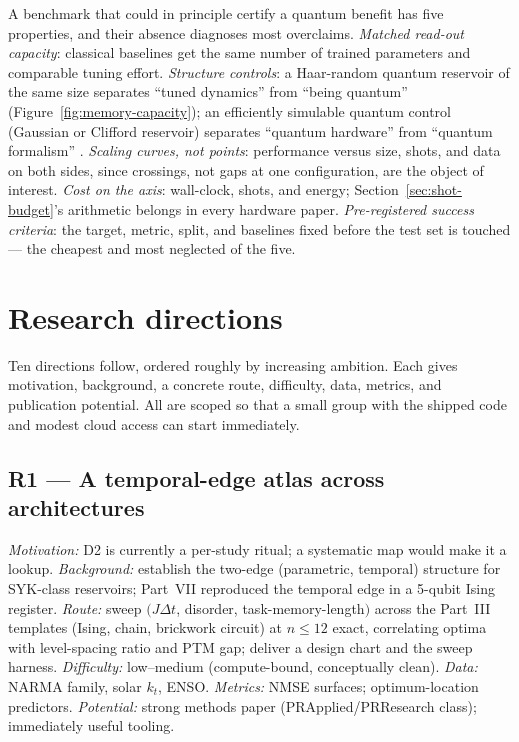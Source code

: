 A benchmark that could in principle certify a quantum benefit has five
properties, and their absence diagnoses most overclaims. \emph{Matched
read-out capacity}: classical baselines get the same number of trained
parameters and comparable tuning effort. \emph{Structure controls}: a
Haar-random quantum reservoir of the same size separates ``tuned dynamics''
from ``being quantum'' (Figure~\ref{fig:memory-capacity}); an efficiently
simulable quantum control (Gaussian or Clifford reservoir) separates
``quantum hardware'' from ``quantum formalism''
\citep{nokkala2021gaussian,gotting2023exploring,palacios2024role}.
\emph{Scaling curves, not points}: performance versus size, shots, and data
on both sides, since crossings, not gaps at one configuration, are the
object of interest. \emph{Cost on the axis}: wall-clock, shots, and energy;
Section~\ref{sec:shot-budget}'s arithmetic belongs in every hardware paper.
\emph{Pre-registered success criteria}: the target, metric, split, and
baselines fixed before the test set is touched --- the cheapest and most
neglected of the five.

\section{Research directions}
\label{sec:research-directions}

Ten directions follow, ordered roughly by increasing ambition. Each gives
motivation, background, a concrete route, difficulty, data, metrics, and
publication potential. All are scoped so that a small group with the shipped
code and modest cloud access can start immediately.

\subsection*{R1 --- A temporal-edge atlas across architectures}
\emph{Motivation:} D2 is currently a per-study ritual; a systematic map
would make it a lookup. \emph{Background:}
\citet{kobayashi2026edge} establish the two-edge (parametric, temporal)
structure for SYK-class reservoirs; Part~VII reproduced the temporal edge in
a 5-qubit Ising register. \emph{Route:} sweep $(J\Delta t$, disorder,
task-memory-length$)$ across the Part~III templates (Ising, chain,
brickwork circuit) at $n\le 12$ exact, correlating optima with level-spacing
ratio and PTM gap; deliver a design chart and the sweep harness.
\emph{Difficulty:} low--medium (compute-bound, conceptually clean).
\emph{Data:} NARMA family, solar $k_t$, ENSO. \emph{Metrics:} NMSE surfaces;
optimum-location predictors. \emph{Potential:} strong methods paper
(PRApplied/PRResearch class); immediately useful tooling.

